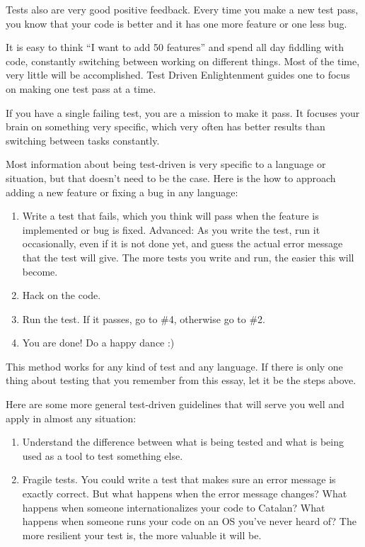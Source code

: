 Tests also are very good positive feedback. Every time you make a new test pass,
you know that your code is better and it has one more feature or one less bug.

It is easy to think ``I want to add 50 features'' and spend all day fiddling
with code, constantly switching between working on different things. Most of the
time, very little will be accomplished. Test Driven Enlightenment guides one to
focus on making one test pass at a time.

If you have a single failing test, you are a mission to make it pass. It focuses
your brain on something very specific, which very often has better results than
switching between tasks constantly.

Most information about being test-driven is very specific to a language or
situation, but that doesn't need to be the case. Here is the how to approach
adding a new feature or fixing a bug in any language:
\begin{enumerate}
 \item Write a test that fails, which you think will pass when the feature is
implemented or bug is fixed. Advanced: As you write the test, run it
occasionally, even if it is not done yet, and guess the actual error message
that the test will give. The more tests you write and run, the easier this will
become.
 \item Hack on the code.
 \item Run the test. If it passes, go to \#4, otherwise go to \#2.
 \item You are done! Do a happy dance :)
\end{enumerate}

This method works for any kind of test and any language. If there is only one
thing about testing that you remember from this essay, let it be the steps
above.

Here are some more general test-driven guidelines that will serve you well and
apply in almost any situation:
\begin{enumerate}
 \item Understand the difference between what is being tested and what is being
used as a tool to test something else.
 \item Fragile tests. You could write a test that makes sure an error message is
exactly correct. But what happens when the error message changes? What happens
when someone internationalizes your code to Catalan? What happens when someone
runs your code on an OS you've never heard of? The more resilient your test is,
the more valuable it will be.
\end{enumerate}

